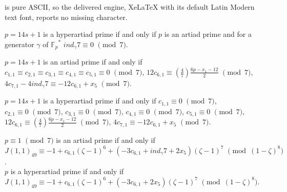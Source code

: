 \documentclass[10pt,a4paper]{amsart}
\def\F{{\mathbb F}}
\def\vpmod{\!\!\!\pmod}
\begin{document}
is pure ASCII, so the delivered engine, XeLaTeX with its default Latin Modern text font, reports no missing character.
\begin{lemma}\label{lem:lemma3}
$p=14s+1$ is a hyperartiad prime if and only if $p$ is an artiad prime and for a generator $\gamma$ of ${\F_{p}}^{*}$ $ind_{\gamma}7\equiv 0\,\,\vpmod 7$.
\end{lemma}

\begin{lemma}\label{lem:lemma4}
 $p=14s+1$ is an artiad prime if and only if $c_{1,1}\equiv c_{2,1}\equiv c_{3,1}\equiv c_{4,1}\equiv c_{5,1}\equiv 0\,\,\vpmod 7$, $12c_{6,1}\equiv (\frac{4}{7})\frac{6p-x_{1}-12}{2}\,\,\vpmod 7$, $4c_{7,1}-4ind_{\gamma}7\equiv -12c_{6,1}+x_{5}\,\,\vpmod 7$.
\end{lemma}

\begin{lemma}\label{lem:lemma5}
$p=14s+1$ is a hyperartiad prime if and only if $c_{1,1}\equiv 0\,\,\vpmod 7$, $c_{2,1}\equiv 0\,\,\vpmod 7$, $c_{3,1}\equiv 0\,\,\vpmod 7$, $c_{4,1}\equiv 0\,\,\vpmod 7$, $c_{5,1}\equiv 0\,\, \vpmod 7$,
$12c_{6,1}\equiv (\frac{4}{7})\frac{6p-x_{1}-12}{2}\,\,\vpmod 7$, $4c_{7,1}\equiv -12c_{6,1}+x_{5}\,\,\vpmod 7$.
\end{lemma}

\begin{theorem}\label{thm:theorem3}
 $p\equiv 1\,\,\vpmod 7$ is an artiad prime if and only if\\
$J(1,1)_{49} \equiv -1+c_{6,1}(\zeta -1)^6+(-3c_{6,1}+ind_{\gamma}7+2x_{5})(\zeta-1)^{7}\,\,\vpmod{(1-\zeta)^{8}}$.\\
 $p$ is a hyperartiad prime if and only if\\
$J(1,1)_{49} \equiv -1+c_{6,1}(\zeta -1)^6+(-3c_{6,1}+2x_{5})(\zeta-1)^7\,\,\vpmod{(1-\zeta)^{8}}$.
\end{theorem}
\end{document}

